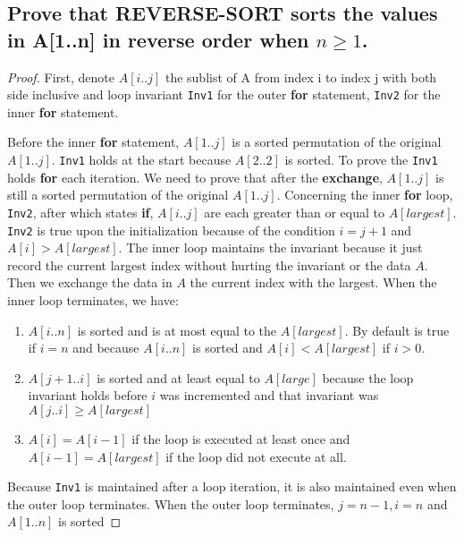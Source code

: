 \documentclass[a4paper]{article}
\newcommand{\code}[1]{\texttt{#1}}
\begin{document}
\subsection{Prove that REVERSE-SORT sorts the values in A[1..n] in reverse order when $n \geq 1$.}
\begin{proof}
    First, denote $A[i..j]$ the sublist of A from index i to index j with both side inclusive and loop invariant \code{Inv1} for the outer \textbf{for} statement, \code{Inv2} for the inner \textbf{for} statement.
    
    Before the inner \textbf{for} statement, $A[1..j]$ is a sorted permutation of the original $A[1..j]$. \code{Inv1} holds at the start because $A[2..2]$ is sorted. To prove the \code{Inv1} holds \textbf{for} each iteration. We need to prove that after the \textbf{exchange}, $A[1..j]$ is still a sorted permutation of the original $A[1..j]$. Concerning the inner \textbf{for} loop, \code{Inv2}, after which states \textbf{if}, $A[i..j]$ are each greater than or equal to $A[largest]$. \code{Inv2} is true upon the initialization because of the condition $i=j+1$ and $A[i]>A[largest]$. The inner loop maintains the invariant because it just record the current largest index without hurting the invariant or the data $A$. Then we exchange the data in $A$ the current index with the largest. When the inner loop terminates, we have:
\begin{enumerate}
    \item $A[i..n]$ is sorted and is at most equal to the $A[largest]$. By default is true if $i=n$ and because $A[i..n]$ is sorted and $A[i]<A[largest]$ if $i>0$.
    \item $A[j+1..i]$ is sorted and at least equal to $A[large]$ because the loop invariant holds before $i$ was incremented and that invariant was $A[j..i]\geq A[largest]$
    \item $A[i]=A[i-1]$ if the loop is executed at least once and $A[i-1]=A[largest]$ if the loop did not execute at all.
\end{enumerate}
Because \code{Inv1} is maintained after a loop iteration, it is also maintained even when the outer loop terminates. When the outer loop terminates, $j=n-1, i=n$ and $A[1..n]$ is sorted
\end{proof}
\end{document}

